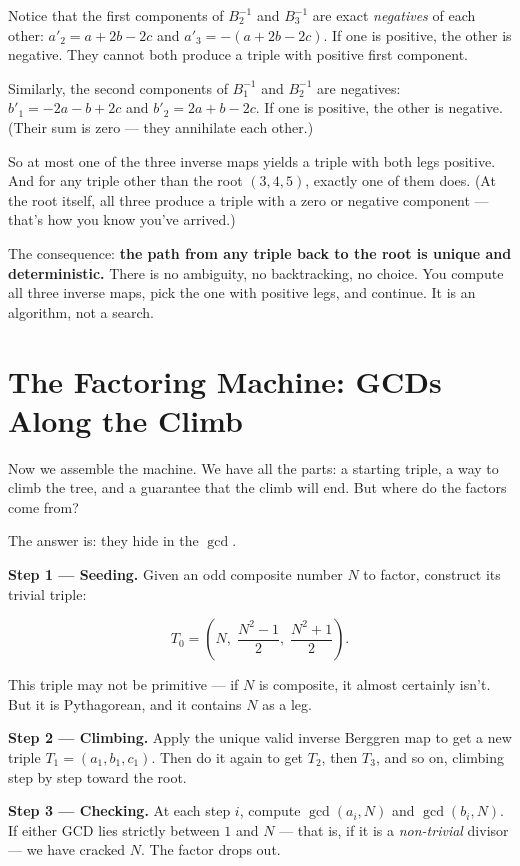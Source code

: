 \documentclass[11pt,twoside,openright]{book}
\theoremstyle{definition}
\theoremstyle{remark}
\begin{document}
Notice that the first components of $B_2^{-1}$ and $B_3^{-1}$ are exact \textit{negatives} of each other: $a'_2 = a + 2b - 2c$ and $a'_3 = -(a + 2b - 2c)$. If one is positive, the other is negative. They cannot both produce a triple with positive first component.

Similarly, the second components of $B_1^{-1}$ and $B_2^{-1}$ are negatives: $b'_1 = -2a - b + 2c$ and $b'_2 = 2a + b - 2c$. If one is positive, the other is negative. (Their sum is zero --- they annihilate each other.)

So at most one of the three inverse maps yields a triple with both legs positive. And for any triple other than the root $(3, 4, 5)$, exactly one of them does. (At the root itself, all three produce a triple with a zero or negative component --- that's how you know you've arrived.)

The consequence: \textbf{the path from any triple back to the root is unique and deterministic.} There is no ambiguity, no backtracking, no choice. You compute all three inverse maps, pick the one with positive legs, and continue. It is an algorithm, not a search.



\section{The Factoring Machine: GCDs Along the Climb}

Now we assemble the machine. We have all the parts: a starting triple, a way to climb the tree, and a guarantee that the climb will end. But where do the factors come from?

The answer is: they hide in the $\gcd$.

\textbf{Step 1 --- Seeding.} Given an odd composite number $N$ to factor, construct its trivial triple:

\[T_0 = \left(N,\;\frac{N^2 - 1}{2},\;\frac{N^2 + 1}{2}\right).\]

This triple may not be primitive --- if $N$ is composite, it almost certainly isn't. But it is Pythagorean, and it contains $N$ as a leg.

\textbf{Step 2 --- Climbing.} Apply the unique valid inverse Berggren map to get a new triple $T_1 = (a_1, b_1, c_1)$. Then do it again to get $T_2$, then $T_3$, and so on, climbing step by step toward the root.

\textbf{Step 3 --- Checking.} At each step $i$, compute $\gcd(a_i, N)$ and $\gcd(b_i, N)$. If either GCD lies strictly between $1$ and $N$ --- that is, if it is a \textit{non-trivial} divisor --- we have cracked $N$. The factor drops out.
\end{document}
